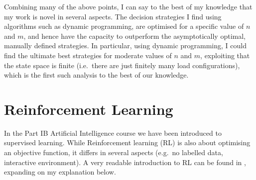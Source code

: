 \begin{itemize}

\end{itemize}


Combining many of the above points, I can say to the best of my knowledge that my work is novel in several aspects. The decision strategies I find using algorithms such as dynamic programming, are optimised for a specific value of $n$ and $m$, and hence have the capacity to outperform the asymptotically optimal, manually defined strategies. In particular, using dynamic programming, I could find the ultimate best strategies for moderate values of $n$ and $m$, exploiting that the state space is finite (i.e.\ there are just finitely many load configurations), which is the first such analysis to the best of our knowledge.


\section{Reinforcement Learning}


In the Part IB Artificial Intelligence course we have been introduced to supervised learning. While Reinforcement learning (RL) is also about optimising an objective function, it differs in several aspects (e.g.\ no labelled data, interactive environment). A very readable introduction to RL can be found in \cite{sutton2018RLbook}, expanding on my explanation below.


